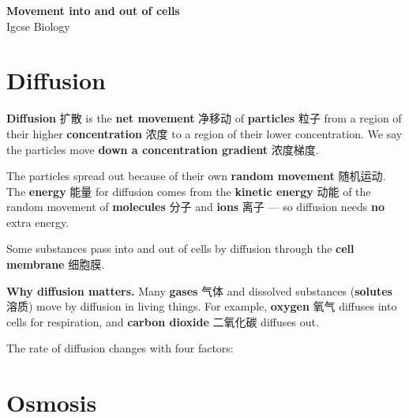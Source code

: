 \documentclass[11pt]{article}
\begin{document}
\begin{center}
  {\LARGE\bfseries Movement into and out of cells}\\[0.35em]
  {\large Igcse Biology}
\end{center}
\vspace{0.6em}

\section*{Diffusion}

\textbf{Diffusion} 扩散 is the \textbf{net movement} 净移动 of \textbf{particles} 粒子 from a region of their higher \textbf{concentration} 浓度 to a region of their lower concentration. We say the particles move \textbf{down a concentration gradient} 浓度梯度.

The particles spread out because of their own \textbf{random movement} 随机运动. The \textbf{energy} 能量 for diffusion comes from the \textbf{kinetic energy} 动能 of the random movement of \textbf{molecules} 分子 and \textbf{ions} 离子 — so diffusion needs \textbf{no} extra energy.

Some substances pass into and out of cells by diffusion through the \textbf{cell membrane} 细胞膜.

\textbf{Why diffusion matters.} Many \textbf{gases} 气体 and dissolved substances (\textbf{solutes} 溶质) move by diffusion in living things. For example, \textbf{oxygen} 氧气 diffuses into cells for respiration, and \textbf{carbon dioxide} 二氧化碳 diffuses out.

The rate of diffusion changes with four factors:

\begin{center}
\end{center}

\section*{Osmosis}
\end{document}
